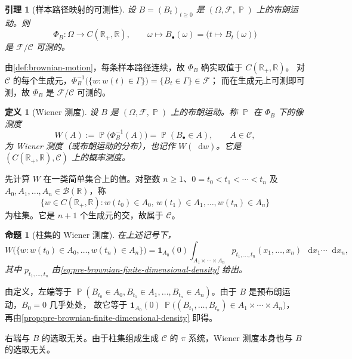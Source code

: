 \documentclass[UTF8,11pt,a4paper,oneside,fontset=fandol]{ctexrep}
\makeatletter
\numberwithin{equation}{section}
\theoremstyle{zhthm}
\newtheorem{proposition}[theorem]{命题}
\newtheorem{lemma}[theorem]{引理}
\newtheorem{definition}[theorem]{定义}
\renewenvironment{proof}[1][\proofname]{\par
  \pushQED{\qed}%
  \normalfont\topsep6\p@\@plus6\p@\relax
  \trivlist
  \item[\hskip\labelsep\bfseries#1\hspace{0.5em}]\ignorespaces
}{%
  \popQED\endtrivlist\@endpefalse
}
\renewcommand{\proofname}{证明}
\newcommand{\R}{\mathbb{R}}
\newcommand{\B}{\mathcal{B}}
\newcommand{\F}{\mathcal{F}}
\DeclareMathOperator{\Prob}{\mathbb{P}}
\newcommand{\ind}[1]{\mathbf{1}_{#1}}
\newcommand{\dd}{\mathop{}\!\mathrm{d}}
\makeatother
\begin{document}
\begin{lemma}[样本路径映射的可测性]
\label{lem:sample-path-map-measurable}
设 $B=(B_t)_{t\ge0}$ 是 $(\Omega,\F,\Prob)$ 上的布朗运动。则
\[
  \Phi_B:\Omega\to C(\R_+,\R),\qquad \omega\mapsto B_\bullet(\omega)=\bigl(t\mapsto B_t(\omega)\bigr)
\]
是 $\F/\mathscr C$ 可测的。
\end{lemma}

\begin{proof}
由\cref{def:brownian-motion}，每条样本路径连续，故 $\Phi_B$ 确实取值于 $C(\R_+,\R)$。
对 $\mathscr C$ 的每个生成元，$\Phi_B^{-1}\bigl(\{w:w(t)\in\Gamma\}\bigr)=\{B_t\in\Gamma\}\in\F$；
而在生成元上可测即可测\cite[定理 1.3.1]{Durrett2019}，故 $\Phi_B$ 是 $\F/\mathscr C$ 可测的。
\end{proof}

\begin{definition}[Wiener 测度]
\label{def:wiener-measure}
设 $B$ 是 $(\Omega,\F,\Prob)$ 上的布朗运动。称 $\Prob$ 在 $\Phi_B$ 下的像测度
\[
  W(A):=\Prob\bigl(\Phi_B^{-1}(A)\bigr)=\Prob(B_\bullet\in A),\qquad A\in\mathscr C,
\]
为 Wiener 测度（或布朗运动的分布），也记作 $W(\dd w)$。它是 $(C(\R_+,\R),\mathscr C)$ 上的概率测度。
\end{definition}

先计算 $W$ 在一类简单集合上的值。对整数 $n\ge1$、$0=t_0<t_1<\cdots<t_n$ 及 $A_0,A_1,\ldots,A_n\in\B(\R)$，称
\[
  \{w\in C(\R_+,\R):w(t_0)\in A_0,\,w(t_1)\in A_1,\ldots,w(t_n)\in A_n\}
\]
为柱集。它是 $n+1$ 个生成元的交，故属于 $\mathscr C$。

\begin{proposition}[柱集的 Wiener 测度]
\label{prop:wiener-cylinder-sets}
在上述记号下，
\[
  W\bigl(\{w:w(t_0)\in A_0,\ldots,w(t_n)\in A_n\}\bigr)
  =\ind{A_0}(0)\int_{A_1\times\cdots\times A_n}p_{t_1,\ldots,t_n}(x_1,\ldots,x_n)\,\dd x_1\cdots\dd x_n,
\]
其中 $p_{t_1,\ldots,t_n}$ 由\cref{eq:pre-brownian-finite-dimensional-density} 给出。
\end{proposition}

\begin{proof}
由定义，左端等于 $\Prob(B_{t_0}\in A_0,B_{t_1}\in A_1,\ldots,B_{t_n}\in A_n)$。由于 $B$ 是预布朗运动，$B_0=0$ 几乎处处，
故它等于 $\ind{A_0}(0)\,\Prob\bigl((B_{t_1},\ldots,B_{t_n})\in A_1\times\cdots\times A_n\bigr)$，
再由\cref{prop:pre-brownian-finite-dimensional-density} 即得。
\end{proof}

右端与 $B$ 的选取无关。由于柱集组成生成 $\mathscr C$ 的 $\pi$ 系统，Wiener 测度本身也与 $B$ 的选取无关。
\end{document}

